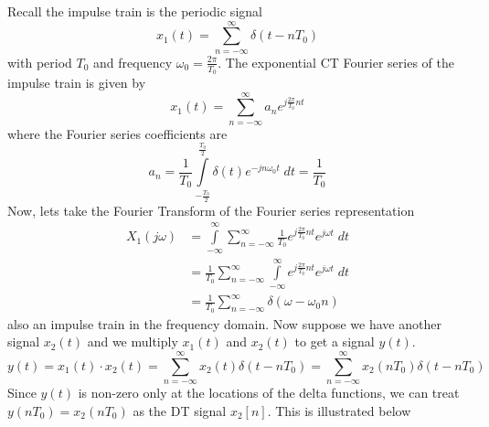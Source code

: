 Recall the impulse train is the periodic signal
\[
x_1(t) = \sum\limits_{n=-\infty}^{\infty} \delta(t-nT_0)
\]
with period $T_0$ and frequency $\omega_0 = \tfrac{2\pi}{T_0}$. The exponential CT Fourier series of the impulse train is given by
\[
x_1(t) = \sum\limits_{n=-\infty}^{\infty} a_n e^{j\tfrac{2\pi}{T_0}nt}
\]
where the Fourier series coefficients are
\[
a_n = \frac{1}{T_0} \int\limits_{-\frac{T_0}{2}}^{\frac{T_0}{2}} \delta(t) e^{-jn\omega_0 t} \; dt = \frac{1}{T_0} 
\]
Now, lets take the Fourier Transform of the Fourier series representation
\begin{align*}
X_1(j\omega) &= \int\limits_{-\infty}^{\infty} \sum\limits_{n=-\infty}^{\infty} \frac{1}{T_0} e^{j\tfrac{2\pi}{T_0}nt}e^{j\omega t}\; dt\\
&= \frac{1}{T_0} \sum\limits_{n=-\infty}^{\infty} \int\limits_{-\infty}^{\infty} e^{j\tfrac{2\pi}{T_0}nt}e^{j\omega t}\; dt\\
&= \frac{1}{T_0} \sum\limits_{n=-\infty}^{\infty} \delta(\omega - \omega_0 n)
\end{align*}
also an impulse train in the frequency domain. Now suppose we have another signal $x_2(t)$ and we multiply $x_1(t)$ and $x_2(t)$ to get a signal $y(t)$.
\[
y(t) = x_1(t) \cdot x_2(t) = \sum\limits_{n=-\infty}^{\infty} x_2(t) \delta(t-nT_0) = \sum\limits_{n=-\infty}^{\infty} x_2(nT_0) \delta(t-nT_0)
\]
Since $y(t)$ is non-zero only at the locations of the delta functions, we can treat $y(nT_0) = x_2(nT_0)$ as the DT signal $x_2[n]$. This is illustrated below

